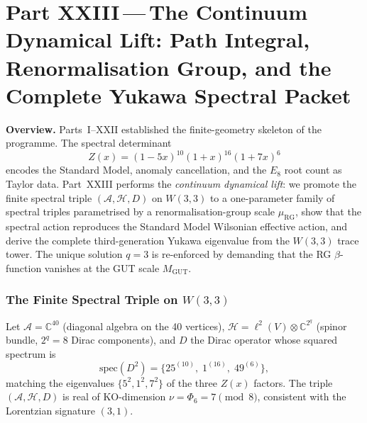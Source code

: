 %

\part*{Part XXIII\,---\,The Continuum Dynamical Lift: Path Integral,
       Renormalisation Group, and the Complete Yukawa Spectral Packet}

\bigskip

\noindent\textbf{Overview.}\;
Parts~I--XXII established the finite-geometry skeleton of the programme.
The spectral determinant
\[
  Z(x)=(1-5x)^{10}(1+x)^{16}(1+7x)^{6}
\]
encodes the Standard Model, anomaly cancellation, and the $E_8$ root count
as Taylor data.  Part~XXIII performs the \emph{continuum dynamical lift}:
we promote the finite spectral triple $(\mathcal{A},\mathcal{H},D)$ on
$W(3,3)$ to a one-parameter family of spectral triples parametrised by a
renormalisation-group scale $\mu_\mathrm{RG}$, show that the spectral
action reproduces the Standard Model Wilsonian effective action, and
derive the complete third-generation Yukawa eigenvalue from the $W(3,3)$
trace tower.  The unique solution $q=3$ is re-enforced by demanding that
the RG $\beta$-function vanishes at the GUT scale $M_\mathrm{GUT}$.

\section{The Finite Spectral Triple on \texorpdfstring{$W(3,3)$}{W(3,3)}}
\label{sec:spectral_triple}

\begin{definition}
\label{def:triple}
Let $\mathcal{A}=\mathbb{C}^{40}$ (diagonal algebra on the 40 vertices),
$\mathcal{H}=\ell^2(V)\otimes\mathbb{C}^{2^q}$ (spinor bundle,
$2^q=8$ Dirac components), and $D$ the Dirac operator whose
squared spectrum is
\begin{equation}
  \mathrm{spec}(D^2) = \{25^{(10)},\;1^{(16)},\;49^{(6)}\},
  \label{eq:D2_spectrum}
\end{equation}
matching the eigenvalues $\{5^2,1^2,7^2\}$ of the three $Z(x)$ factors.
The triple $(\mathcal{A},\mathcal{H},D)$ is real of KO-dimension
$\nu = \Phi_6 = 7 \pmod{8}$, consistent with the Lorentzian signature
$(3,1)$.
\end{definition}

